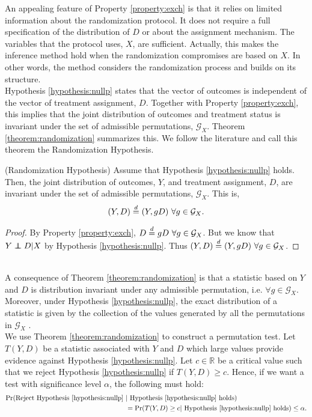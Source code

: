 \noindent An appealing feature of Property \ref{property:exch} is that it relies on limited information about the randomization protocol. It does not require a full specification of the distribution of $D$ or about the assignment mechanism. The variables that the protocol uses, $X$, are sufficient. Actually, this makes the inference method hold when the randomization compromises are based on $X$. In other words, the method considers the randomization process and builds on its structure.\\
\indent Hypothesis \ref{hypothesis:nullp} states that the vector of outcomes is independent of the vector of treatment assignment, $D$. Together with Property \ref{property:exch}, this implies that the joint distribution of outcomes and treatment status is invariant under the set of admissible permutations, $\mathcal{G}_{X}$. Theorem \ref{theorem:randomization} summarizes this. We follow the literature and call this theorem the Randomization Hypothesis.
\begin{theorem} \label{theorem:randomization} (Randomization Hypothesis)
Assume that Hypothesis \ref{hypothesis:nullp} holds. Then, the joint distribution of outcomes, $Y$, and treatment assignment, $D$, are invariant under the set of admissible permutations, $\mathcal{G}_X$. This is,
$$(Y,D)\overset{d}{=} (Y,gD) \ \forall g\in\mathcal{G}_X .$$
\end{theorem}
\begin{proof}
By Property \ref{property:exch}, $D \overset{d}{=} gD \ \forall g\in\mathcal{G}_X $. But we know that $Y
\independent D|X$ by Hypothesis \ref{hypothesis:nullp}. Thus $(Y,D)\overset{d}{=} (Y,gD) \ \forall g\in\mathcal{G}_X$.
\end{proof}\\

\indent A consequence of Theorem \ref{theorem:randomization} is that a statistic based on $Y$ and $D$ is distribution invariant under any admissible permutation, i.e. $\forall g \in \mathcal{G}_{X}$. Moreover, under Hypothesis \ref{hypothesis:nullp}, the exact distribution of a statistic is given by the collection of the values generated by all the permutations in $\mathcal{G}_{X}$ \citep[see][]{romano2005testing}.\\
\indent We use Theorem \ref{theorem:randomization} to construct a permutation test. Let $T(Y,D)$ be a statistic associated with $Y$ and $D$ which large values provide evidence against Hypothesis \ref{hypothesis:nullp}. Let $c \in \mathbb{R}$ be a critical value such that we reject Hypothesis \ref{hypothesis:nullp} if $T(Y,D) \geq c$. Hence, if we want a test with significance level $\alpha$, the following must hold:
\begin{align}
    \Pr(\text{Reject Hypothesis~\ref{hypothesis:nullp} } &| \text{ Hypothesis~\ref{hypothesis:nullp} holds}) \nonumber \\
\label{eq:TYD}
    &= \Pr(T(Y, D)\geq c| \text{ Hypothesis~\ref{hypothesis:nullp} holds}) \leq \alpha.
\end{align}

